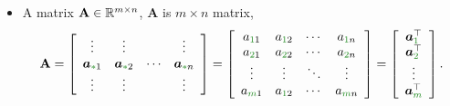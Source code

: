 \documentclass[12pt,thmsa]{article}
\begin{document}
\begin{itemize}
	\item A matrix \(\mathbf{A} \in \mathbb{R}^{\color{black}{m} \times \color{black}{n}} \), \( \mathbf{A} \) is \(m \times n\) matrix,
	\[ \mathbf{A}
	= \left[
	\begin{array}{cccc} 
		{\vdots} & {\vdots} & & {\vdots} \\ 
		{\boldsymbol{a}_{{\color{forestgreen}*}1}} & {\boldsymbol{a}_{{\color{forestgreen}*}2}} & {\cdots} & {\boldsymbol{a}_{{\color{forestgreen}*}n}}\\ 
		{\vdots} & {\vdots} & & {\vdots}
	\end{array}
	\right] 
	= \left[
	\begin{array}{cccc}
		a_{{\color{forestgreen}1}1} & a_{{\color{forestgreen}1}2} & \cdots & a_{{\color{forestgreen}1}n} \\
		a_{{\color{forestgreen}2}1} & a_{{\color{forestgreen}2}2} & \cdots & a_{{\color{forestgreen}2}n} \\
		\vdots & \vdots & \ddots & \vdots \\
		a_{{\color{forestgreen}m}1} & a_{{\color{forestgreen}{\color{forestgreen}1}}2} & \cdots & a_{{\color{forestgreen}m}n} \\
	\end{array}
	\right]
	=\left[
	\begin{array}{c}{\boldsymbol{a}_{{\color{forestgreen}1}}^{\top}} \\
		\boldsymbol{a}_{{\color{forestgreen}2}}^{\top} \\
		{\vdots} \\ 
		{\boldsymbol{a}_{{\color{forestgreen}m}}^{\top}}
	\end{array}
	\right].
	\]
	

\end{itemize}
\end{document}
